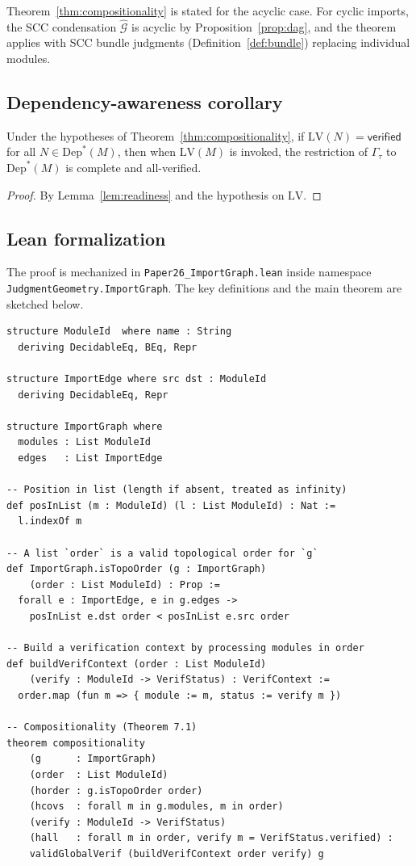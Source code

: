 \documentclass[11pt]{article}
\newcommand{\IG}{\mathcal{G}}              %
\newcommand{\Dep}{\mathrm{Dep}}            %
\newcommand{\TopoOrd}{\tau}                %
\newcommand{\LocalVerif}{\mathrm{LV}}      %
\newcommand{\CondGraph}{\widehat{\IG}}     %
\newcommand{\VerifCtx}{\Gamma}             %
\begin{document}
\begin{remark}
Theorem~\ref{thm:compositionality} is stated for the acyclic case.
For cyclic imports, the SCC condensation $\CondGraph$ is acyclic by
Proposition~\ref{prop:dag}, and the theorem applies with SCC bundle
judgments (Definition~\ref{def:bundle}) replacing individual modules.
\end{remark}

\subsection{Dependency-awareness corollary}

\begin{corollary}
\label{cor:dep-aware}
Under the hypotheses of Theorem~\ref{thm:compositionality}, if
$\LocalVerif(N) = \mathsf{verified}$ for all $N \in \Dep^*(M)$, then
when $\LocalVerif(M)$ is invoked, the restriction of
$\VerifCtx_{\TopoOrd}$ to $\Dep^*(M)$ is complete and all-verified.
\end{corollary}

\begin{proof}
By Lemma~\ref{lem:readiness} and the hypothesis on $\LocalVerif$.
\end{proof}

\subsection{Lean formalization}

The proof is mechanized in \texttt{Paper26\_Import\-Graph.lean} inside
namespace \texttt{JudgmentGeometry.ImportGraph}.  The key definitions
and the main theorem are sketched below.

\begin{verbatim}
structure ModuleId  where name : String
  deriving DecidableEq, BEq, Repr

structure ImportEdge where src dst : ModuleId
  deriving DecidableEq, Repr

structure ImportGraph where
  modules : List ModuleId
  edges   : List ImportEdge

-- Position in list (length if absent, treated as infinity)
def posInList (m : ModuleId) (l : List ModuleId) : Nat :=
  l.indexOf m

-- A list `order` is a valid topological order for `g`
def ImportGraph.isTopoOrder (g : ImportGraph)
    (order : List ModuleId) : Prop :=
  forall e : ImportEdge, e in g.edges ->
    posInList e.dst order < posInList e.src order

-- Build a verification context by processing modules in order
def buildVerifContext (order : List ModuleId)
    (verify : ModuleId -> VerifStatus) : VerifContext :=
  order.map (fun m => { module := m, status := verify m })

-- Compositionality (Theorem 7.1)
theorem compositionality
    (g      : ImportGraph)
    (order  : List ModuleId)
    (horder : g.isTopoOrder order)
    (hcovs  : forall m in g.modules, m in order)
    (verify : ModuleId -> VerifStatus)
    (hall   : forall m in order, verify m = VerifStatus.verified) :
    validGlobalVerif (buildVerifContext order verify) g
\end{verbatim}
\end{document}

